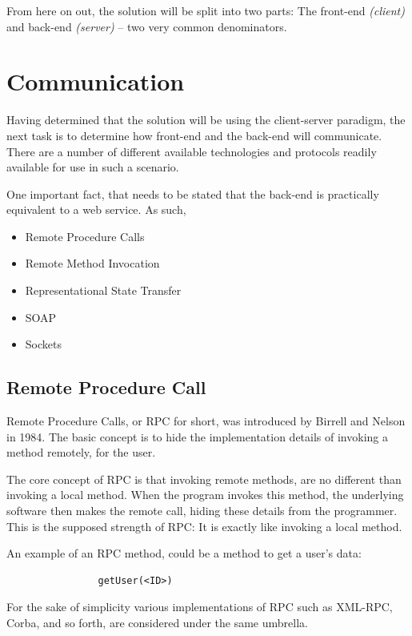 			From here on out, the solution will be split into two parts: The front-end \emph{(client)} and back-end \emph{(server)} -- two very common denominators.

	\section{Communication}
		\label{sec:comms}
		Having determined that the solution will be using the client-server paradigm, the next task is to determine how front-end and the back-end will communicate. There are a number of different available technologies and protocols readily available for use in such a scenario.

		One important fact, that needs to be stated that the back-end is practically equivalent to a web service. As such, 

		\begin{itemize}
			\item Remote Procedure Calls
			\item Remote Method Invocation
			\item Representational State Transfer
			\item SOAP	
			\item Sockets
		\end{itemize}

		\subsection{Remote Procedure Call}
			Remote Procedure Calls, or RPC for short, was introduced by Birrell and Nelson \cite{birell1984} in 1984. The basic concept is to hide the implementation details of invoking a method remotely, for the user.

			The core concept of RPC is that invoking remote methods, are no different than invoking a local method. When the program invokes this method, the underlying software then makes the remote call, hiding these details from the programmer. This is the supposed strength of RPC: It is exactly like invoking a local method.

			An example of an RPC method, could be a method to get a user's data:
			\begin{verbatim}
				getUser(<ID>)
			\end{verbatim}

			For the sake of simplicity various implementations of RPC such as XML-RPC, Corba, and so forth, are considered under the same umbrella.
		
